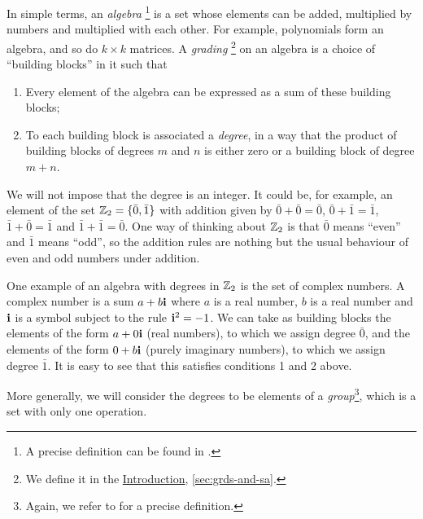 \begin{prefatory}
In simple terms, an \emph{algebra}
\footnote{A precise definition can be found in \cite[Chapter 1]{MR3932087}.}
is a set whose elements can be added, multiplied by numbers and multiplied with each other. 
For example, polynomials form an algebra, and so do $k \times k$ matrices. 
A \emph{grading}
\footnote{
    We define it in the \hyperref[chap:intro]{Introduction}, \cref{sec:grds-and-sa}.
} 
on an algebra is a choice of ``building blocks'' in it such that
\begin{enumerate}
    \item Every element of the algebra can be expressed as a sum of these building blocks;
    \item To each building block is associated a \emph{degree}, in a way that the product of building blocks of degrees $m$ and $n$ is either zero or a building block of degree $m+n$.
\end{enumerate}
We will not impose that the degree is an integer. 
It could be, for example, an element of the set $\mathbb{Z}_2 = \{ \bar 0, \bar 1 \}$ with addition given by 
$\bar 0 + \bar 0 = \bar 0$, 
$\bar 0 + \bar 1 = \bar 1$, 
$\bar 1 + \bar 0 = \bar 1$ and 
$\bar 1 + \bar 1 = \bar 0$. 
One way of thinking about $\mathbb{Z}_2$ is that $\bar 0$ means ``even'' and $\bar 1$ means ``odd'', so the addition rules are nothing but the usual behaviour of even and odd numbers under addition. 

One example of an algebra with degrees in $\mathbb{Z}_2$ is the set of complex numbers. 
A complex number is a sum $a + b\mathbf{i}$ where $a$ is a real number, $b$ is a real number and $\mathbf{i}$ is a symbol subject to the rule $\mathbf{i}^2 = -1$. 
We can take as building blocks the elements of the form $a + 0\mathbf{i}$ (real numbers), to which we assign degree $\bar 0$, and the elements of the form $0 + b\mathbf{i}$ (purely imaginary numbers), to which we assign degree $\bar 1$. 
It is easy to see that this satisfies conditions 1 and 2 above. 

More generally, we will consider the degrees to be elements of a \emph{group}\footnote{Again, we refer to \cite[Chapter 1]{MR3932087} for a precise definition.}, which is a set with only one operation. 


\end{prefatory}
